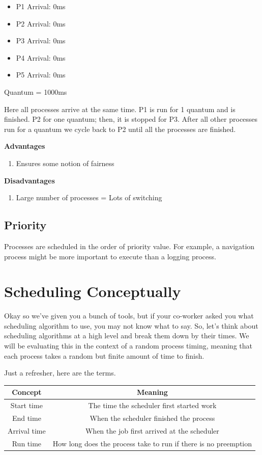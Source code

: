 \begin{itemize}
\tightlist
\item
  P1 Arrival: 0ms
\item
  P2 Arrival: 0ms
\item
  P3 Arrival: 0ms
\item
  P4 Arrival: 0ms
\item
  P5 Arrival: 0ms
\end{itemize}

Quantum = 1000ms

Here all processes arrive at the same time.
P1 is run for 1 quantum and is finished.
P2 for one quantum; then, it is stopped for P3.
After all other processes run for a quantum we cycle back to P2 until all the processes are finished.

\textbf{Advantages}

\begin{enumerate}
  \item Ensures some notion of fairness
\end{enumerate}

\textbf{Disadvantages}

\begin{enumerate}
  \item Large number of processes = Lots of switching
\end{enumerate}

\subsection{Priority}

Processes are scheduled in the order of priority value.
For example, a navigation process might be more important to execute than a logging process.

\section{Scheduling Conceptually}

Okay so we've given you a bunch of tools, but if your co-worker asked you what scheduling algorithm to use, you may not know what to say.
So, let's think about scheduling algorithms at a high level and break them down by their times.
We will be evaluating this in the context of a random process timing, meaning that each process takes a random but finite amount of time to finish.

Just a refresher, here are the terms.

\begin{tabular}{|c|c|}
  Concept & Meaning \\ \hline
  Start time & The time the scheduler first started work \\
  End time & When the scheduler finished the process \\
  Arrival time & When the job first arrived at the scheduler \\
  Run time & How long does the process take to run if there is no preemption
\end{tabular}


